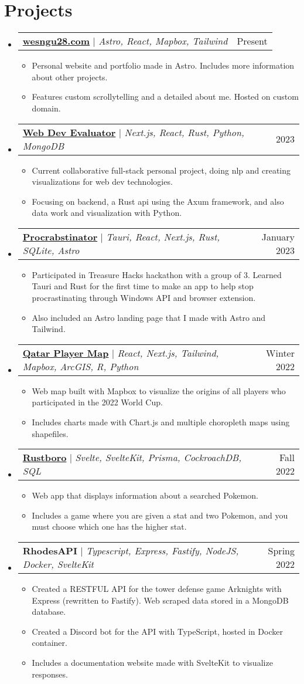 \documentclass[letterpaper,11pt]{article}
\makeatletter
\newcommand{\resumeItem}[1]{
  \item\small{
    {#1 \vspace{-2pt}}
  }
}
\newcommand{\resumeProjectHeading}[2]{
    \item
    \begin{tabular*}{0.97\textwidth}{l@{\extracolsep{\fill}}r}
      \small#1 & #2 \\
    \end{tabular*}\vspace{-7pt}
}
\newcommand{\resumeSubHeadingListStart}{\begin{itemize}[leftmargin=0.15in, label={}]}
\newcommand{\resumeSubHeadingListEnd}{\end{itemize}}
\newcommand{\resumeItemListStart}{\begin{itemize}}
\newcommand{\resumeItemListEnd}{\end{itemize}\vspace{-5pt}}
\makeatother
\begin{document}
\section{Projects}
    \vspace{-5pt}
    \resumeSubHeadingListStart
        \resumeProjectHeading
          {\textbf{\href{https://wesngu28.com}{wesngu28.com}} $|$ \emph{Astro, React, Mapbox, Tailwind}}{Present}
          \resumeItemListStart
            \resumeItem{Personal website and portfolio made in Astro. Includes more information about other projects.}
            \resumeItem{Features custom scrollytelling and a detailed about me. Hosted on custom domain.}
          \resumeItemListEnd
        \resumeProjectHeading
          {\textbf{\href{https://github.com/kyleung1/WebDevEvaluator/}{Web Dev Evaluator}} $|$ \emph{Next.js, React, Rust, Python, MongoDB}}{2023}
          \resumeItemListStart
            \resumeItem{Current collaborative full-stack personal project, doing nlp and creating visualizations for web dev technologies.}
            \resumeItem{Focusing on backend, a Rust api using the Axum framework, and also data work and visualization with Python.}
          \resumeItemListEnd
        \resumeProjectHeading
          {\textbf{\href{https://github.com/mistralton/procrabstinator/}{Procrabstinator}} $|$ \emph{Tauri, React, Next.js, Rust, SQLite, Astro}}{January 2023}
          \resumeItemListStart
            \resumeItem{Participated in Treasure Hacks hackathon with a group of 3. Learned Tauri and Rust for the first time to make an app to help stop procrastinating through Windows API and browser extension.}
            \resumeItem{Also included an Astro landing page that I made with Astro and Tailwind.}
        \resumeItemListEnd
        \resumeProjectHeading
          {\textbf{\href{https://qatarwcplayers.vercel.app/}{Qatar Player Map}} $|$ \emph{React, Next.js, Tailwind, Mapbox, ArcGIS, R, Python}}{Winter 2022}
          \resumeItemListStart
            \resumeItem{Web map built with Mapbox to visualize the origins of all players who participated in the 2022 World Cup.}
            \resumeItem{Includes charts made with Chart.js and multiple choropleth maps using shapefiles.}
          \resumeItemListEnd
      \resumeProjectHeading
          {\textbf{\href{https://rustboro.vercel.app/}{Rustboro}} $|$ \emph{Svelte, SvelteKit, Prisma, CockroachDB, SQL}}{Fall 2022}
          \resumeItemListStart
            \resumeItem{Web app that displays information about a searched Pokemon.}
            \resumeItem{Includes a game where you are given a stat and two Pokemon, and you must choose which one has the higher stat.}
          \resumeItemListEnd
        \resumeProjectHeading
          {\textbf{RhodesAPI} $|$ \emph{Typescript, Express, Fastify, NodeJS, Docker, SvelteKit}}{Spring 2022}
          \resumeItemListStart
            \resumeItem{Created a RESTFUL API for the tower defense game Arknights with Express (rewritten to Fastify). Web scraped data stored in a MongoDB database.}
            \resumeItem{Created a Discord bot for the API with TypeScript, hosted in Docker container.}
            \resumeItem{Includes a documentation website made with SvelteKit to visualize responses.}
          \resumeItemListEnd
    \resumeSubHeadingListEnd
\end{document}

